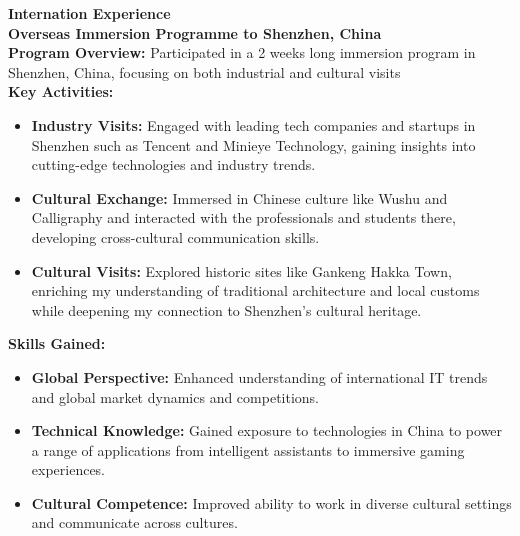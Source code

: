 \documentclass[10pt,A4]{article}
\newcommand{\activities}[6] {
    \textcolor{royalpurple} {\textbf{#1}} \\[5pt]
    \textbf{#2} \hfill \colorbox{maincol}{\makebox[0.15\textwidth]{\textit{#3}}} \\[5pt]
	\textbf{Program Overview:} #4 \\[10pt]
	\textbf{Key Activities:}
	\begin{itemize}
		#5
	\end{itemize}
	\textbf{Skills Gained:} 
	\begin{itemize}
		#6
	\end{itemize}
}
\begin{document}
\begin{paracol}{2}
\begin{rightcolumn}
\activities
	{Internation Experience}
	{Overseas Immersion Programme to Shenzhen, China}
	{March 2024}
	{Participated in a 2 weeks long immersion program in Shenzhen, China, focusing on both industrial and cultural visits}
	{
        \item \textbf{Industry Visits:} Engaged with leading tech companies and startups in Shenzhen such as Tencent and Minieye Technology, gaining insights into cutting-edge technologies and industry trends.
        \item \textbf{Cultural Exchange:} Immersed in Chinese culture like Wushu and Calligraphy and interacted with the professionals and students there, developing cross-cultural communication skills.
        \item \textbf{Cultural Visits:} Explored historic sites like Gankeng Hakka Town, enriching my understanding of traditional architecture and local customs while deepening my connection to Shenzhen’s cultural heritage.}
    {
        \item \textbf{Global Perspective:} Enhanced understanding of international IT trends and global market dynamics and competitions.
        \item \textbf{Technical Knowledge:} Gained exposure to technologies in China to power a range of applications from intelligent assistants to immersive gaming experiences.
        \item \textbf{Cultural Competence:} Improved ability to work in diverse cultural settings and communicate across cultures.
    }

\vfill\null

\mbox{}
\vfill
\mbox{}
\vfill
\mbox{}
\vfill
\mbox{}
\end{rightcolumn}
\end{paracol}
\end{document}
